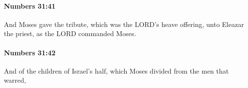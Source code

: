 		\paragraph{Numbers 31:41} %
			\label{NUMBERS-31-41}

			And Moses gave the tribute, which was the LORD’s heave offering, unto Eleazar the priest, as the LORD commanded Moses.


		\paragraph{Numbers 31:42} %
			\label{NUMBERS-31-42}

			And of the children of Israel’s half, which Moses divided from the men that warred,


